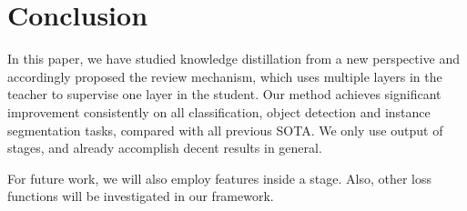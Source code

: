 \documentclass[final]{cvpr}
\begin{document}
\section{Conclusion}
In this paper, we have studied knowledge distillation from a new perspective and accordingly proposed the review mechanism, which uses multiple layers in the teacher to supervise one layer in the student. Our method achieves significant improvement consistently on all classification, object detection and instance segmentation tasks, compared with all previous SOTA. We only use output of stages, and already accomplish decent results in general. 

For future work, we will also employ features inside a stage. Also, other loss functions will be investigated in our framework.

{\small


}
\end{document}
